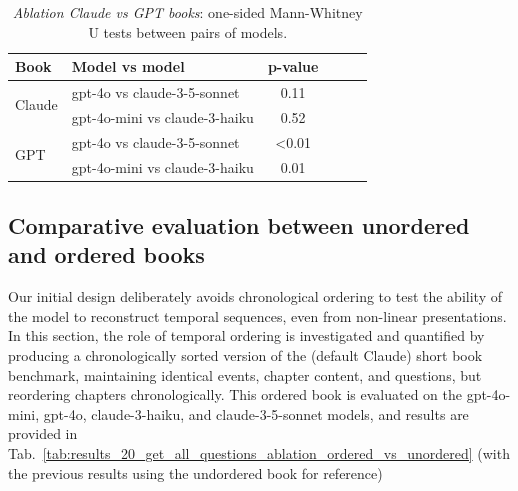 \documentclass{article}
\begin{document}
\begin{table}[htbp]
\caption{\textit{Ablation Claude vs GPT books}: one-sided Mann-Whitney U tests between pairs of models.}
\label{tab:pvalue_gpt_vs_claude}
\centering
\begin{tabular}{@{}llcccc@{}}
\toprule
 \bf Book & \bf Model vs model & \bf p-value \\ \midrule
\multirow{2}{*}{Claude} & gpt-4o vs claude-3-5-sonnet & 0.11 & \\
 & gpt-4o-mini vs claude-3-haiku & 0.52 \\
\multirow{2}{*}{GPT} & gpt-4o vs claude-3-5-sonnet & <0.01 \\
 & gpt-4o-mini vs claude-3-haiku & 0.01 \\ \bottomrule
\end{tabular}
\end{table}




\subsection{Comparative evaluation between unordered and ordered books}\label{app:ablation_ordered_books}

Our initial design deliberately avoids chronological ordering to test the ability of the model to reconstruct temporal sequences, even from non-linear presentations.
In this section, the role of temporal ordering is investigated and quantified by producing a chronologically sorted version of the (default Claude) short book benchmark, maintaining identical events, chapter content, and questions, but reordering chapters chronologically.
This ordered book is evaluated on the gpt-4o-mini, gpt-4o, claude-3-haiku, and claude-3-5-sonnet models, and results are provided in Tab.~\ref{tab:results_20_get_all_questions_ablation_ordered_vs_unordered} (with the previous results using the undordered book for reference)
\end{document}

